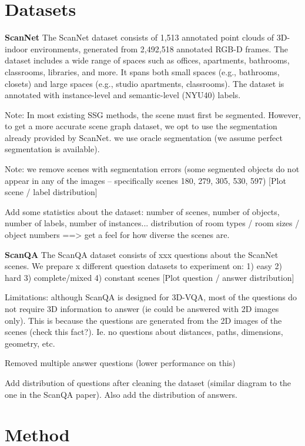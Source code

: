 \newpage
\chapter{Datasets}
\textbf{ScanNet}
The ScanNet dataset consists of 1,513 annotated point clouds of 3D-indoor environments, generated from 2,492,518 annotated RGB-D frames. The dataset includes a wide range of spaces such as offices, apartments, bathrooms, classrooms, libraries, and more. It spans both small spaces (e.g., bathrooms, closets) and large spaces (e.g., studio apartments, classrooms). The dataset is annotated with instance-level and semantic-level (NYU40) labels.

Note: In most existing SSG methods, the scene must first be segmented. However, to get a more accurate scene graph dataset, we opt to use the segmentation already provided by ScanNet. we use oracle segmentation (we assume perfect segmentation is available).

Note: we remove scenes with segmentation errors (some segmented objects do not appear in any of the images -- specifically scenes 180, 279, 305, 530, 597)
[Plot scene / label distribution]

Add some statistics about the dataset: number of scenes, number of objects, number of labels, number of instances...
distribution of room types / room sizes / object numbers ==> get a feel for how diverse the scenes are.

\noindent
\textbf{ScanQA}
The ScanQA dataset consists of xxx questions about the ScanNet scenes.
We prepare x different question datasets to experiment on: 1) easy 2) hard 3) complete/mixed 4) constant scenes
[Plot question / answer distribution]

Limitations: although ScanQA is designed for 3D-VQA, most of the questions do not require 3D information to answer (ie could be answered with 2D images only). This is because the questions are generated from the 2D images of the scenes (check this fact?). Ie. no questions about distances, paths, dimensions, geometry, etc.

Removed multiple answer questions (lower performance on this)

Add distribution of questions after cleaning the dataset (similar diagram to the one in the ScanQA paper).
Also add the distribution of answers.

\newpage
\chapter{Method}

